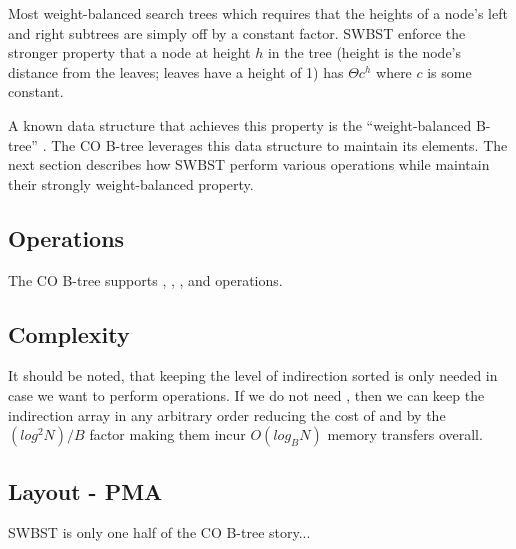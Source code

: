 \documentclass{style}
\begin{document}
Most weight-balanced search trees which requires that the heights of a node's left and right subtrees are
simply off by a constant factor. SWBST enforce the stronger property that a node at height $h$ in the tree (height is the node's
distance from the leaves; leaves have a height of 1) has $\Theta c^h$ where $c$ is some constant. 

A known data structure that achieves this property is the ``weight-balanced B-tree'' \cite{paper}. The CO B-tree leverages this
data structure to maintain its elements. The next section describes how SWBST perform various operations
while maintain their strongly weight-balanced property.

\subsection{Operations}

The CO B-tree supports \Search, \Insert, \Delete, and \Scan operations. 

\subsection{Complexity}



It should be noted, that keeping the level of indirection sorted is only needed in case we want
to perform \Scan operations. If we do not need \Scan, then we can keep the indirection array in any arbitrary order
reducing the cost of \Insert and \Delete by the $(log^2 N) /B$ factor making them incur $O(log_{B} N)$ memory transfers
overall. 

\subsection{Layout - PMA}
\label{sec:layout}

SWBST is only one half of the CO B-tree story...
\end{document}
